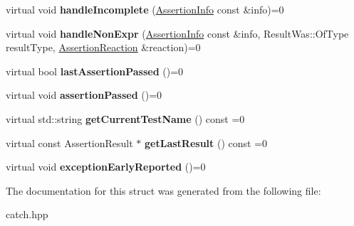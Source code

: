 \begin{DoxyCompactItemize}
\item 
virtual void {\bfseries handle\+Incomplete} (\hyperlink{structCatch_1_1AssertionInfo}{Assertion\+Info} const \&info)=0\hypertarget{structCatch_1_1IResultCapture_a89b89372eb09cc44f8dcad363de6157d}{}\label{structCatch_1_1IResultCapture_a89b89372eb09cc44f8dcad363de6157d}

\item 
virtual void {\bfseries handle\+Non\+Expr} (\hyperlink{structCatch_1_1AssertionInfo}{Assertion\+Info} const \&info, Result\+Was\+::\+Of\+Type result\+Type, \hyperlink{structCatch_1_1AssertionReaction}{Assertion\+Reaction} \&reaction)=0\hypertarget{structCatch_1_1IResultCapture_ab7dbdf8aa28427119583e24dbb302c63}{}\label{structCatch_1_1IResultCapture_ab7dbdf8aa28427119583e24dbb302c63}

\item 
virtual bool {\bfseries last\+Assertion\+Passed} ()=0\hypertarget{structCatch_1_1IResultCapture_a973435fbdcb2f6f07a0ec5719a01e956}{}\label{structCatch_1_1IResultCapture_a973435fbdcb2f6f07a0ec5719a01e956}

\item 
virtual void {\bfseries assertion\+Passed} ()=0\hypertarget{structCatch_1_1IResultCapture_a9b0ef2cb071e9a9dc6ec1b533026aea7}{}\label{structCatch_1_1IResultCapture_a9b0ef2cb071e9a9dc6ec1b533026aea7}

\item 
virtual std\+::string {\bfseries get\+Current\+Test\+Name} () const =0\hypertarget{structCatch_1_1IResultCapture_aea1617f4a84cc648246aa3ed6918b5bf}{}\label{structCatch_1_1IResultCapture_aea1617f4a84cc648246aa3ed6918b5bf}

\item 
virtual const Assertion\+Result $\ast$ {\bfseries get\+Last\+Result} () const =0\hypertarget{structCatch_1_1IResultCapture_ab18872c89fab97405a56e9c6a4919736}{}\label{structCatch_1_1IResultCapture_ab18872c89fab97405a56e9c6a4919736}

\item 
virtual void {\bfseries exception\+Early\+Reported} ()=0\hypertarget{structCatch_1_1IResultCapture_ae63ecec95db4c236c63ecf616f483810}{}\label{structCatch_1_1IResultCapture_ae63ecec95db4c236c63ecf616f483810}

\end{DoxyCompactItemize}


The documentation for this struct was generated from the following file\+:\begin{DoxyCompactItemize}
\item 
catch.\+hpp\end{DoxyCompactItemize}
